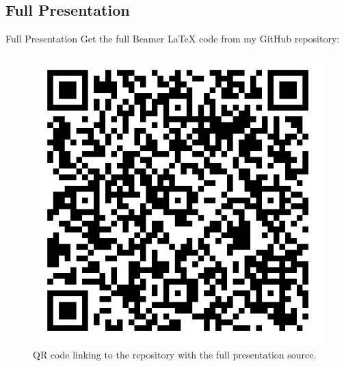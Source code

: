 \documentclass{beamer}
\begin{document}
\subsection{Full Presentation}
\begin{frame}{Full Presentation}
    Get the full Beamer \LaTeX{} code from my GitHub repository:
    \begin{figure}
        \centering
        \includegraphics[width=0.25\linewidth]{repo.png}
        \caption{QR code linking to the repository with the full presentation source.}
    \end{figure}
\end{frame}
\end{document}
